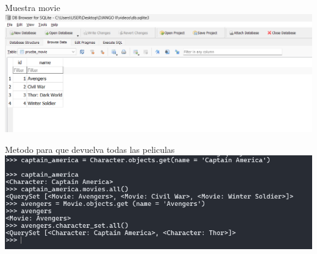 \documentclass{article}
\begin{document}
        \newline \newline 
        \item Muestra movie
        \newline \newline
        \includegraphics[width=1\textwidth,keepaspectratio]{IMAGENES/Evidencia Tercer video IV.png}
        \newline \newline 
        \item Metodo para que devuelva todas las peliculas
        \newline \newline\newline
        \includegraphics[width=1\textwidth,keepaspectratio]{IMAGENES/Evidencia Cuarto video I.png}
        \newline
\end{document}
